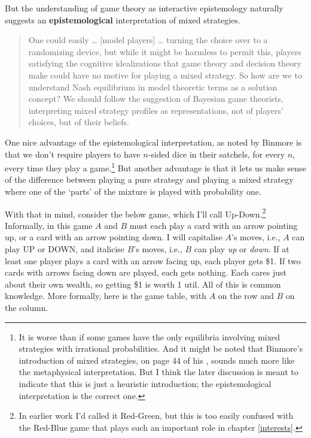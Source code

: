 \documentclass[11pt,]{book}
\let\rmarkdownfootnote\footnote%
\def\footnote{\protect\rmarkdownfootnote}
\begin{document}
But the understanding of game theory as interactive epistemology naturally suggests an \textbf{epistemological} interpretation of mixed strategies.

\begin{quote}
One could easily \ldots{} {[}model players{]} \ldots{} turning the choice over to a randomizing device, but while it might be harmless to permit this, players satisfying the cognitive idealizations that game theory and decision theory make could have no motive for playing a mixed strategy. So how are we to understand Nash equilibrium in model theoretic terms as a solution concept? We should follow the suggestion of Bayesian game theorists, interpreting mixed strategy profiles as representations, not of players' choices, but of their beliefs. \citep[ 57-8]{Stalnaker1994}
\end{quote}

One nice advantage of the epistemological interpretation, as noted by Binmore \citeyearpar[ 185]{Binmore2007} is that we don't require players to have \(n\)-sided dice in their satchels, for every \(n\), every time they play a game.\footnote{It is worse than if some games have the only equilibria involving mixed strategies with irrational probabilities. And it might be noted that Binmore's introduction of mixed strategies, on page 44 of his \citeyearpar{Binmore2007}, sounds much more like the metaphysical interpretation. But I think the later discussion is meant to indicate that this is just a heuristic introduction; the epistemological interpretation is the correct one.} But another advantage is that it lets us make sense of the difference between playing a pure strategy and playing a mixed strategy where one of the `parts' of the mixture is played with probability one.

With that in mind, consider the below game, which I'll call Up-Down.\footnote{In earlier work I'd called it Red-Green, but this is too easily confused with the Red-Blue game that plays such an important role in chapter \ref{interests}.} Informally, in this game \(A\) and \(B\) must each play a card with an arrow pointing up, or a card with an arrow pointing down. I will capitalise \(A\)'s moves, i.e., \(A\) can play UP or DOWN, and italicise \(B\)'s moves, i.e., \(B\) can play \emph{up} or \emph{down}. If at least one player plays a card with an arrow facing up, each player gets \$1. If two cards with arrows facing down are played, each gets nothing. Each cares just about their own wealth, so getting \$1 is worth 1 util. All of this is common knowledge. More formally, here is the game table, with \(A\) on the row and \(B\) on the column.
\end{document}

